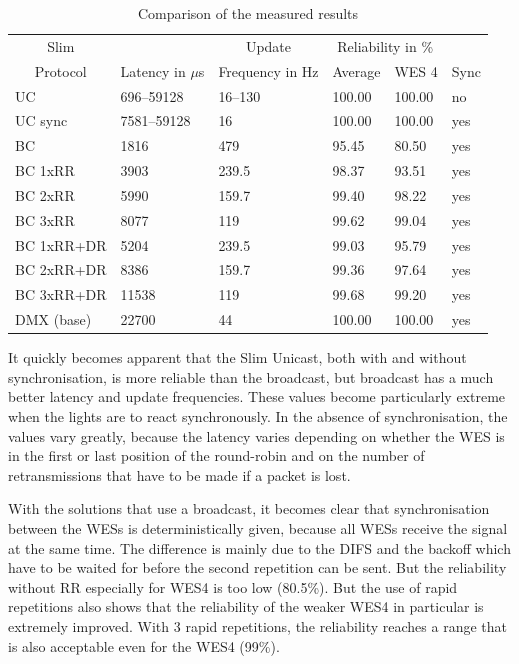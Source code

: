 \begin{table}[h]
	\centering
	\begin{tabular} { llllll }
	\toprule
	\multicolumn{1}{c}{Slim}
	& \multicolumn{1}{c}{}
	& \multicolumn{1}{c}{Update}
	& \multicolumn{2}{c}{Reliability in \%} 
	& \multicolumn{1}{c}{} \\

	\multicolumn{1}{c}{Protocol}
	& \multicolumn{1}{c}{Latency in $\mu$s}
	& \multicolumn{1}{c}{Frequency in Hz}
	& \multicolumn{1}{c}{Average}
	& \multicolumn{1}{c}{WES 4}
	& \multicolumn{1}{c}{Sync} \\

	\midrule
	UC        &  696–59128 & 16–130  & 100.00 & 100.00 & no \\
	UC sync   & 7581–59128 & 16      & 100.00 & 100.00 & yes \\
	BC        &  1816      & 479     & 95.45  & 80.50  & yes \\
	BC 1xRR   &  3903      & 239.5   & 98.37  & 93.51  & yes \\
	BC 2xRR   &  5990      & 159.7   & 99.40  & 98.22  & yes \\
	BC 3xRR   &  8077      & 119     & 99.62  & 99.04  & yes \\
	BC 1xRR+DR&  5204      & 239.5   & 99.03  & 95.79  & yes \\
	BC 2xRR+DR&  8386      & 159.7   & 99.36  & 97.64  & yes \\
	BC 3xRR+DR&  11538     & 119     & 99.68  & 99.20  & yes \\
	DMX (base)&  22700     & 44      & 100.00 & 100.00 & yes \\
	\bottomrule
	\end{tabular}
	\caption{Comparison of the measured results}
	\label{tab:results}
\end{table}

It quickly becomes apparent that the Slim Unicast, both with and without synchronisation, 
is more reliable than the broadcast, but broadcast has a much better latency and update frequencies.
These values become particularly extreme when the lights are to react synchronously.
In the absence of synchronisation, the values vary greatly, 
because the latency varies depending on whether the WES is in the first or last position of the round-robin
and on the number of retransmissions that have to be made if a packet is lost.

With the solutions that use a broadcast, 
it becomes clear that synchronisation between the WESs is deterministically given,
because all WESs receive the signal at the same time.
The difference is mainly due to the DIFS and the backoff 
which have to be waited for before the second repetition can be sent.
But the reliability without RR especially for WES4 is too low (80.5\%).
But the use of rapid repetitions also shows that the reliability of the weaker WES4 in particular is extremely improved.
With 3 rapid repetitions, the reliability reaches a range that is also acceptable even for the WES4 (99\%).

